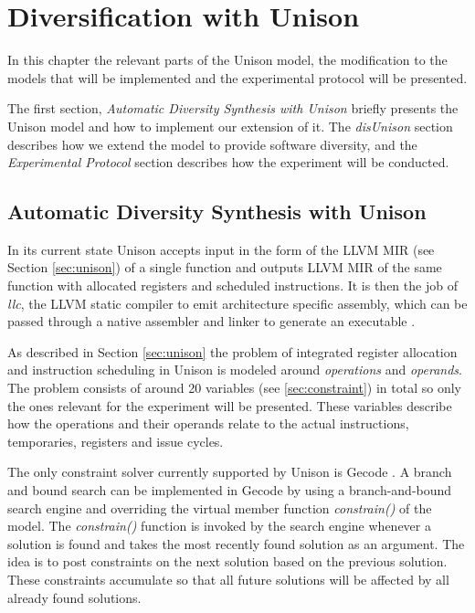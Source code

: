 \chapter{Diversification with Unison}

In this chapter the relevant parts of the Unison model, the modification to the models that
will be implemented and the experimental protocol will be presented.

The first section, \textit{Automatic Diversity Synthesis with Unison} briefly presents the
Unison model and how to implement our extension of it. The \textit{disUnison} section
describes how we extend the model to provide software diversity, and the
\textit{Experimental Protocol} section describes how the experiment will be conducted.

\section{Automatic Diversity Synthesis with Unison}
\label{sec:unison-model}

In its current state Unison accepts input in the form of the LLVM MIR (see Section
\ref{sec:unison}) of a single function \cite{unison-docs} and outputs LLVM MIR of the same
function with allocated registers and scheduled instructions. It is then the job of
\textit{llc}, the LLVM static compiler to emit architecture specific assembly, which can
be passed through a native assembler and linker to generate an executable \cite{llvm-llc}.

As described in Section \ref{sec:unison} the problem of integrated register allocation and
instruction scheduling in Unison is modeled around \textit{operations} and \textit{operands}.
The problem consists of around 20 variables (see \ref{sec:constraint}) in total so only the
ones relevant for the experiment will be presented. These variables describe how the
operations and their operands relate to the actual instructions, temporaries, registers
and issue cycles.

The only constraint solver currently supported by Unison is Gecode \cite{unison-docs}. A
branch and bound search can be implemented in Gecode by using a branch-and-bound search
engine and overriding the virtual member function \textit{constrain()} of the model. The
\textit{constrain()} function is invoked by the search engine whenever a solution is found
and takes the most recently found solution as an argument. The idea is to post constraints
on the next solution based on the previous solution. These constraints accumulate so
that all future solutions will be affected by all already found solutions.

